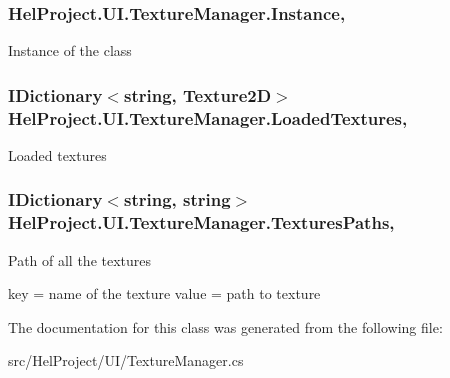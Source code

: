 \subsubsection[{Instance}]{ Hel\+Project.\+U\+I.\+Texture\+Manager.\+Instance\hspace{0.3cm}{\ttfamily [static]}, {\ttfamily [get]}}\label{class_hel_project_1_1_u_i_1_1_texture_manager_a583c9e38fd71caf9d6b1cf4a1543ca0a}


Instance of the class 

\hypertarget{class_hel_project_1_1_u_i_1_1_texture_manager_a57751418291b635f8c1f16f8ef9a1468}{}
\subsubsection[{Loaded\+Textures}]{\setlength{\rightskip}{0pt plus 5cm}I\+Dictionary$<$string, Texture2\+D$>$ Hel\+Project.\+U\+I.\+Texture\+Manager.\+Loaded\+Textures\hspace{0.3cm}{\ttfamily [get]}, {\ttfamily [set]}}\label{class_hel_project_1_1_u_i_1_1_texture_manager_a57751418291b635f8c1f16f8ef9a1468}


Loaded textures 

\hypertarget{class_hel_project_1_1_u_i_1_1_texture_manager_a0524c77f2c5fd5c6f3eb57645bf8a521}{}
\subsubsection[{Textures\+Paths}]{\setlength{\rightskip}{0pt plus 5cm}I\+Dictionary$<$string, string$>$ Hel\+Project.\+U\+I.\+Texture\+Manager.\+Textures\+Paths\hspace{0.3cm}{\ttfamily [get]}, {\ttfamily [set]}}\label{class_hel_project_1_1_u_i_1_1_texture_manager_a0524c77f2c5fd5c6f3eb57645bf8a521}


Path of all the textures 

key = name of the texture value = path to texture 

The documentation for this class was generated from the following file\+:\begin{DoxyCompactItemize}
\item 
src/\+Hel\+Project/\+U\+I/Texture\+Manager.\+cs\end{DoxyCompactItemize}
